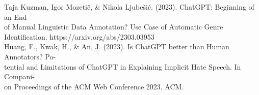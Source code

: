 \documentclass[12pt,a4paper]{article}
\begin{document}
\noindent Taja Kuzman, Igor Mozetič, \& Nikola Ljubešić. (2023). ChatGPT: Beginning of an End \\
\indent of Manual Linguistic Data Annotation? Use Case of Automatic Genre Identification. https://arxiv.org/abs/2303.03953 \\ 

\noindent Huang, F., Kwak, H., \& An, J. (2023). Is ChatGPT better than Human Annotators? Po- \\
\indent tential and Limitations of ChatGPT in Explaining Implicit Hate Speech. In Compani-\\
\indent on Proceedings of the ACM Web Conference 2023. ACM. \\
\end{document}
